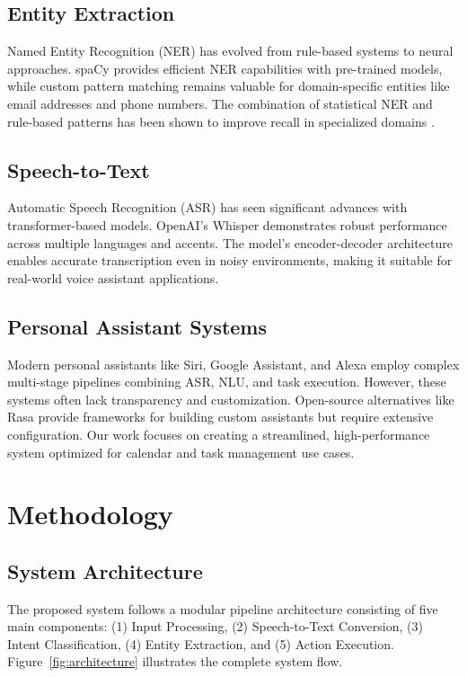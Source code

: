 \documentclass[conference]{IEEEtran}
\begin{document}
\subsection{Entity Extraction}

Named Entity Recognition (NER) has evolved from rule-based systems to neural approaches. spaCy \cite{honnibal2017spacy} provides efficient NER capabilities with pre-trained models, while custom pattern matching remains valuable for domain-specific entities like email addresses and phone numbers. The combination of statistical NER and rule-based patterns has been shown to improve recall in specialized domains \cite{liu2019survey}.

\subsection{Speech-to-Text}

Automatic Speech Recognition (ASR) has seen significant advances with transformer-based models. OpenAI's Whisper \cite{radford2022robust} demonstrates robust performance across multiple languages and accents. The model's encoder-decoder architecture enables accurate transcription even in noisy environments, making it suitable for real-world voice assistant applications.

\subsection{Personal Assistant Systems}

Modern personal assistants like Siri, Google Assistant, and Alexa employ complex multi-stage pipelines combining ASR, NLU, and task execution. However, these systems often lack transparency and customization. Open-source alternatives like Rasa \cite{rasa2020} provide frameworks for building custom assistants but require extensive configuration. Our work focuses on creating a streamlined, high-performance system optimized for calendar and task management use cases.

\section{Methodology}

\subsection{System Architecture}

The proposed system follows a modular pipeline architecture consisting of five main components: (1) Input Processing, (2) Speech-to-Text Conversion, (3) Intent Classification, (4) Entity Extraction, and (5) Action Execution. Figure~\ref{fig:architecture} illustrates the complete system flow.
\end{document}
